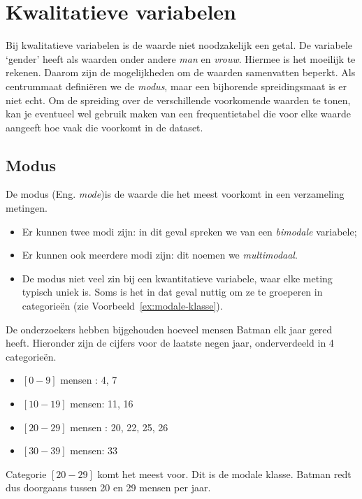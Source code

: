 \section{Kwalitatieve variabelen}

Bij kwalitatieve variabelen is de waarde niet noodzakelijk een getal. De variabele `gender' heeft als waarden onder andere \emph{man} en \emph{vrouw}. Hiermee is het moeilijk te rekenen. Daarom zijn de mogelijkheden om de waarden samenvatten beperkt. Als centrummaat definiëren we de \emph{modus}, maar een bijhorende spreidingsmaat is er niet echt. Om de spreiding over de verschillende voorkomende waarden te tonen, kan je eventueel wel gebruik maken van een frequentietabel die voor elke waarde aangeeft hoe vaak die voorkomt in de dataset.

\subsection{Modus}

\begin{definition}[Modus]
  De  modus (Eng. \emph{mode})is de waarde die het meest voorkomt in een verzameling metingen.
\end{definition}

\begin{itemize}
  \item Er kunnen twee modi zijn: in dit geval spreken we van een \emph{bimodale} variabele;
  \item Er kunnen ook meerdere modi zijn: dit noemen we  \emph{multimodaal}.
  \item De modus niet veel zin bij een kwantitatieve variabele, waar elke meting typisch uniek is. Soms is het in dat geval nuttig om ze te groeperen in categorieën (zie Voorbeeld~\ref{ex:modale-klasse}).
\end{itemize}

\begin{example}
  \label{ex:modale-klasse}
  De onderzoekers hebben bijgehouden hoeveel mensen Batman elk jaar gered heeft. Hieronder zijn de cijfers voor de laatste negen jaar, onderverdeeld in 4 categorieën.
  
  \begin{itemize}
    \item $[0-9]$ mensen : 4, 7
    \item $[10-19]$ mensen: 11, 16
    \item $[20-29]$ mensen : 20, 22, 25, 26
    \item $[30-39]$ mensen: 33
  \end{itemize}

  Categorie $[20-29]$ komt het meest voor. Dit is de modale klasse. Batman redt dus doorgaans tussen 20 en 29 mensen per jaar.
\end{example}

